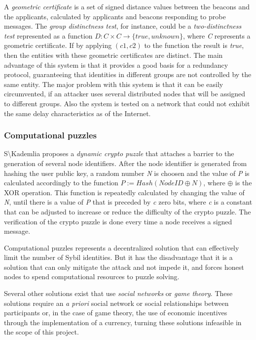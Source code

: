 A \textit{geometric certificate} is a set of signed distance values between the beacons and the applicants, calculated by applicants and beacons responding to probe messages.
The \textit{group distinctness test}, for instance, could be a \textit{two-distinctness test} represented as a function \(D: C\times C\rightarrow \{true, unknown\} \), where \textit{C} represents a geometric certificate. If by applying \((c1,c2)\) to the function the result is \textit{true}, then the entities with these geometric certificates are distinct.
The main advantage of this system is that it provides a good basis for a redundancy protocol, guaranteeing that identities in different groups are not controlled by the same entity.
The major problem with this system is that it can be easily circumvented, if an attacker uses several distributed nodes that will be assigned to different groups.
Also the system is tested on a network that could not exhibit the same delay characteristics as of the Internet.

\subsubsection{Computational puzzles}

S\textbackslash{Kademlia}\cite{Baumgart2007} proposes a \textit{dynamic crypto puzzle} that attaches a barrier to the generation of several node identifiers.
After the node identifier is generated from hashing the user public key, a random number \textit{N} is choosen and the value of \textit{P} is calculated accordingly to the function \(P := Hash(NodeID \oplus N)\), where \(\oplus\) is the XOR operation.
This function is repeatedly calculated by changing the value of \textit{N}, until there is a value of \textit{P} that is preceded by \textit{c} zero bits, where \textit{c} is a constant that can be adjusted to increase or reduce the difficulty of the crypto puzzle.
The verification of the crypto puzzle is done every time a node receives a signed message.

Computational puzzles represents a decentralized solution that can effectively limit the number of Sybil identities.
But it has the disadvantage that it is a solution that can only mitigate the attack and not impede it, and forces honest nodes to spend computational resources to puzzle solving.

Several other solutions exist that use \textit{social networks}\cite{Yu2008}\cite{Yu2010} or \textit{game theory}\cite{Margolin2008}. These solutions require an \textit{a priori} social network or social relationships between participants or, in the case of game theory, the use of economic incentives through the implementation of a currency, turning these solutions infeasible in the scope of this project.

